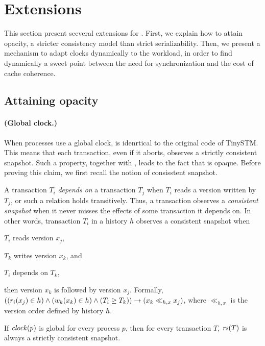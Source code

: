 \section{Extensions}

This section present seeveral extensions for .
First, we explain how to attain opacity, a stricter consistency model than strict serializability.
Then, we present a mechanism to adapt clocks dynamically to the workload, in order to find dynamically a sweet point between the need for synchronization and the cost of cache coherence.

\subsection{Attaining opacity}

\paragraph{(Global clock.)}
When processes use a global clock,  is idenrtical to the original code of TinySTM.
This means that each transaction, even if it aborts, observes a strictly consistent snapshot.
Such a property, together with , leads to the fact that  is opaque.
Before proving this claim, we first recall the notion of consisstent snapshot.

A transaction $T_i$ \emph{depends on} a transaction $T_j$ when $T_i$ reads a version written by $T_j$, or such a relation holds transitively.
Thus, a transaction observes a \emph{consistent snapshot} \cite{Chan:1985} when it never misses the effects of some transaction it depends on.
In other words, transaction $T_i$ in a history $h$ observes a consistent snapshot when
\begin{inparaenum}[\em(i)]
\item $T_i$ reads version $x_j$,
\item $T_k$ writes version $x_k$, and 
\item $T_i$ depends on $T_{k}$,
\end{inparaenum}
then version $x_k$ is followed by version $x_j$.
Formally, $((r_i(x_j) \in h) \land (w_k(x_k) \in h) \land (T_i \depends T_k)) \implies (x_k \ll_{h,x} x_j)$, where $\ll_{h,x}$ is the version order defined by history $h$.

\begin{proposition}
  If $\clockOf{p}$ is global for every process $p$, then for every transaction $T$, $\readSetOf{T}$ is always a strictly consistent snapshot.
\end{proposition}

